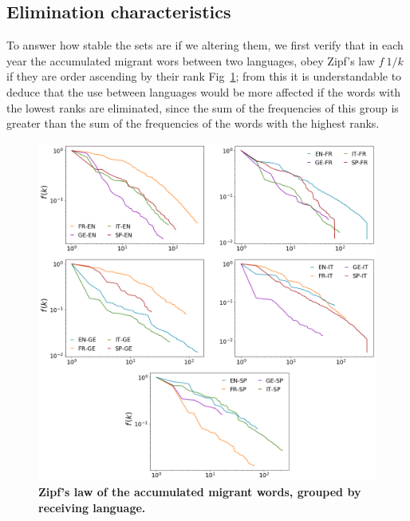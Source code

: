 \documentclass[10pt,letterpaper]{article} %
\begin{document}
\subsection*{Elimination characteristics}

To answer how stable the sets are if we altering them, we first verify that in each year the accumulated migrant wors between two languages, obey Zipf's law $f~1/k$ if they are order ascending by their rank Fig~\ref{fig.ZL_receiving}; from this it is understandable to deduce that the use between languages would be more affected if the words with the lowest ranks are eliminated, since the sum of the frequencies of this group is greater than the sum of the frequencies of the words with the highest ranks.

\begin{figure}[!h]
	\begin{adjustwidth}{-2.5cm}{1cm}
		\centering
		\includegraphics[scale=.38]{ZL_receptor.png}
		\caption{{\bf Zipf's law of the accumulated migrant words, grouped by receiving language.} }
		\label{fig.ZL_receiving}
	\end{adjustwidth}
\end{figure}
\end{document}
